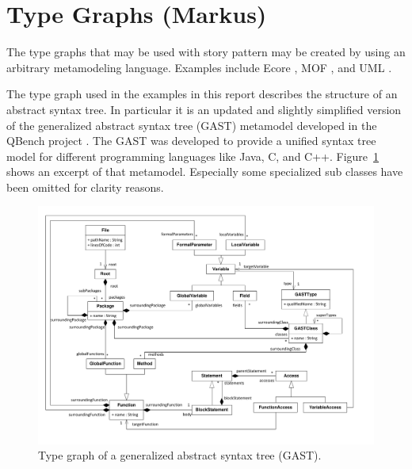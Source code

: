 \section{Type Graphs (Markus)}
\label{sec:typeGraph}

The type graphs that may be used with story pattern may be created by using an arbitrary metamodeling language. Examples include Ecore \cite{SBP+08}, MOF \cite{MOF05}, and UML \cite{UML23}.

The type graph used in the examples in this report describes the structure of an abstract syntax tree. In particular it is an updated and slightly simplified version of the generalized abstract syntax tree (GAST) metamodel developed in the QBench project \cite{QBench}. The GAST was developed to provide a unified syntax tree model for different programming languages like Java, C, and C++. Figure~\ref{fig:gast-mm} shows an excerpt of that metamodel. Especially some specialized sub classes have been omitted for clarity reasons.

\begin{figure}[htbp]
  \centering
  \includegraphics[width=\linewidth]{figures/gast-mm}
  \caption{Type graph of a generalized abstract syntax tree (GAST).}
  \label{fig:gast-mm}
\end{figure}


